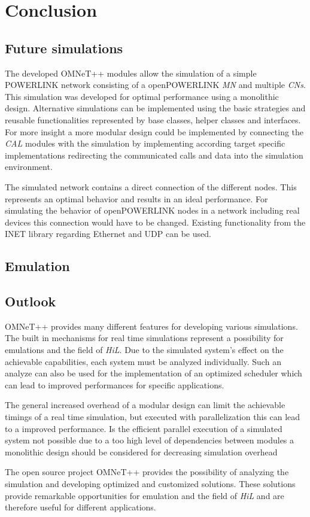 \chapter{Conclusion}
\label{cha:conclusion}

\section{Future simulations}
\label{sec:conclusion_futuresim}
The developed OMNeT++ modules allow the simulation of a simple POWERLINK network consisting of a openPOWERLINK \emph{MN} and multiple \emph{CNs}.
This simulation was developed for optimal performance using a monolithic design.
Alternative simulations can be implemented using the basic strategies and reusable functionalities represented by base classes, helper classes and interfaces.
For more insight a more modular design could be implemented by connecting the \emph{CAL} modules with the simulation by implementing according target specific implementations redirecting the communicated calls and data into the simulation environment.

The simulated network contains a direct connection of the different nodes.
This represents an optimal behavior and results in an ideal performance.
For simulating the behavior of openPOWERLINK nodes in a network including real devices this connection would have to be changed.
Existing functionality from the INET library regarding Ethernet and UDP can be used.

\section{Emulation}
\label{sec:conclusion_emulation}



\section{Outlook}
\label{sec:conclusion_outlook}


OMNeT++ provides many different features for developing various simulations.
The built in mechanisms for real time simulations represent a possibility for emulations and the field of \emph{HiL}.
Due to the simulated system's effect on the achievable capabilities, each system must be analyzed individually.
Such an analyze can also be used for the implementation of an optimized scheduler which can lead to improved performances for specific applications.


The general increased overhead of a modular design can limit the achievable timings of a real time simulation, but executed with parallelization this can lead to a improved performance.
Is the efficient parallel execution of a simulated system not possible due to a too high level of dependencies between modules a monolithic design should be considered for decreasing simulation overhead


The open source project OMNeT++ provides the possibility of analyzing the simulation and developing optimized and customized solutions.
These solutions provide remarkable opportunities for emulation and the field of \emph{HiL} and are therefore useful for different applications.